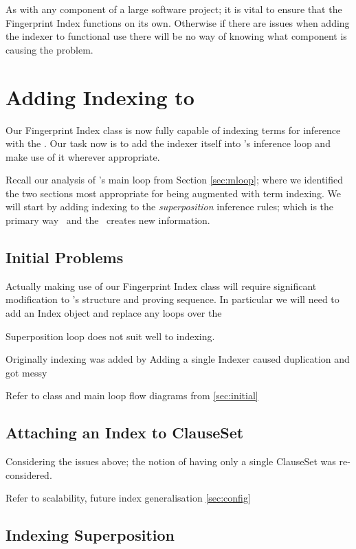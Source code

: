 As with any component of a large software project; it is vital to ensure that the
Fingerprint Index functions on its own. Otherwise if there are issues when adding
the indexer to functional use there will be no way of knowing what component is
causing the problem.


\section{Adding Indexing to \Beagle}
Our Fingerprint Index class is now fully capable of indexing terms for inference
with the \HSWAC. Our task now is to add the indexer itself into \beagle's inference
loop and make use of it wherever appropriate.

Recall our analysis of \beagle's main loop from Section \ref{sec:mloop}; where we identified
the two sections most appropriate for being augmented with term indexing. We will
start by adding indexing to the \emph{superposition} inference rules; which is
the primary way \beagle\ and the \HSWAC\ creates new information.



\subsection{Initial Problems}

Actually making use of our Fingerprint Index class will require significant modification
to \beagle's structure and proving sequence. In particular we will need
to add an Index object and replace any loops over the 

Superposition loop does not suit well to indexing. 

Originally indexing was added by 
Adding a single Indexer caused duplication and got messy

Refer to class and main loop flow diagrams from \ref{sec:initial}

\subsection{Attaching an Index to ClauseSet}

Considering the issues above; the notion of having only a single
ClauseSet was re-considered. 

Refer to scalability, future index generalisation \ref{sec:config}

\subsection{Indexing Superposition}

